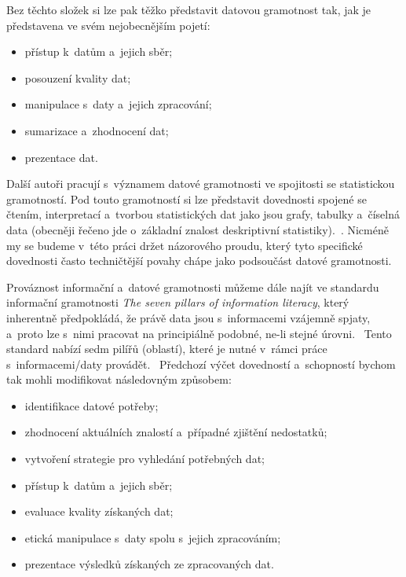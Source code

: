 Bez těchto složek si lze pak těžko představit datovou gramotnost tak, jak je představena ve svém nejobecnějším pojetí:~\parencite[8]{schield05}

\begin{itemize}
\tightlist
\item
  přístup k~datům a~jejich sběr;
\item
  posouzení kvality dat;
\item
  manipulace s~daty a~jejich zpracování;
\item
  sumarizace a~zhodnocení dat;
\item
  prezentace dat.
\end{itemize}

Další autoři pracují s~významem datové gramotnosti ve spojitosti se statistickou gramotností. Pod touto gramotností si lze představit dovednosti spojené se čtením, interpretací a~tvorbou statistických dat jako jsou grafy, tabulky a~číselná data (obecněji řečeno jde o~základní znalost deskriptivní statistiky).~\parencite[8]{schield05}. Nicméně my se budeme v~této práci držet názorového proudu, který tyto specifické dovednosti často techničtější povahy chápe jako podsoučást datové gramotnosti.~\parencite[125]{calzada13}

Prováznost informační a~datové gramotnosti můžeme dále najít ve standardu informační gramotnosti \emph{The seven pillars of information literacy}, který inherentně předpokládá, že právě data jsou s~informacemi vzájemně spjaty, a~proto lze s~nimi pracovat na principiálně podobné, ne-li stejné úrovni.~\parencite[126]{calzada13} Tento standard nabízí sedm pilířů (oblastí), které je nutné v~rámci práce s~informacemi/daty provádět.~\parencite{sconul11} Předchozí výčet dovedností a~schopností bychom tak mohli modifikovat následovným způsobem:

\begin{itemize}
\tightlist
\item
  identifikace datové potřeby;
\item
  zhodnocení aktuálních znalostí a~případné zjištění nedostatků;
\item
  vytvoření strategie pro vyhledání potřebných dat;
\item
  přístup k~datům a~jejich sběr;
\item
  evaluace kvality získaných dat;
\item
  etická manipulace s~daty spolu s~jejich zpracováním;
\item
  prezentace výsledků získaných ze zpracovaných dat.
\end{itemize}

